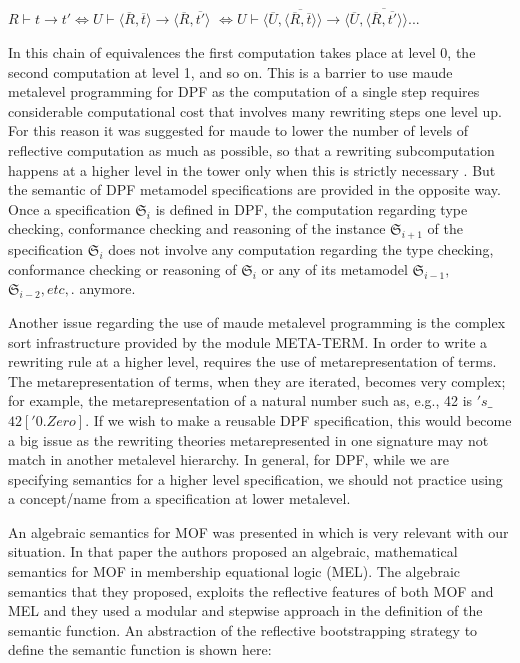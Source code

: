 \documentclass{eceasst}
\begin{document}
\begin{center}
$R \vdash t \rightarrow t' \Leftrightarrow U \vdash \langle \overline{R}, \overline{t} \rangle \rightarrow \langle \overline{R}, \overline{t'} \rangle $
 $\Leftrightarrow U \vdash \langle \overline{U}, \overline{ \langle \overline{R}, \overline{t} \rangle } \rangle \rightarrow \langle \overline{U}, \overline{\langle \overline{R}, \overline{t'} \rangle } \rangle  ...$
\end{center}

In this chain of equivalences the first computation takes place at level 0, the second computation at level 1, and so on. 
This is a barrier to use maude metalevel programming for DPF as the computation of a single step requires considerable computational cost that involves many rewriting steps one level up. 
For this reason it was suggested for maude to lower the number of levels of reflective computation as much as possible, so that a rewriting 
subcomputation happens at a higher level in the tower only when this is strictly necessary \cite{Clavel2007}.
But the semantic of DPF metamodel specifications are provided in the opposite way. 
Once a specification $\mathfrak{S}_i$ is defined in DPF, the computation regarding type checking, conformance checking and reasoning of 
the instance $\mathfrak{S}_{i+1}$ of the specification $\mathfrak{S}_i$ does not involve any computation regarding the type checking, conformance checking or reasoning of 
$\mathfrak{S}_i$ or any of its metamodel $\mathfrak{S}_{i-1},$ $\mathfrak{S}_{i-2}, etc,.$ anymore. 

Another issue regarding the use of maude metalevel programming is the complex sort infrastructure provided by the module META-TERM. 
In order to write a rewriting rule at a higher level, requires the use of metarepresentation of terms. 
The metarepresentation of terms, when they are iterated, becomes very complex; for example, the metarepresentation of a natural number such as, e.g., 42 is $'s\_$ $\hat{}$  $42['0.Zero]$. 
If we wish to make a reusable DPF specification, this would become a big issue as the rewriting theories metarepresented in one signature may not match in another metalevel hierarchy. 
In general, for DPF, while we are specifying semantics for a higher level specification, we should not practice using a concept/name from a specification at lower metalevel. 

An algebraic semantics for MOF was presented in \cite{BoronatM10} which is very relevant with our situation. 
In that paper the authors proposed an algebraic, mathematical semantics for MOF in membership equational logic (MEL).
The algebraic semantics that they proposed, exploits the reflective features of both MOF and MEL and they used a modular and stepwise approach in the definition of the semantic function. 
An abstraction of the reflective bootstrapping strategy to define the semantic function is shown here:
\end{document}
